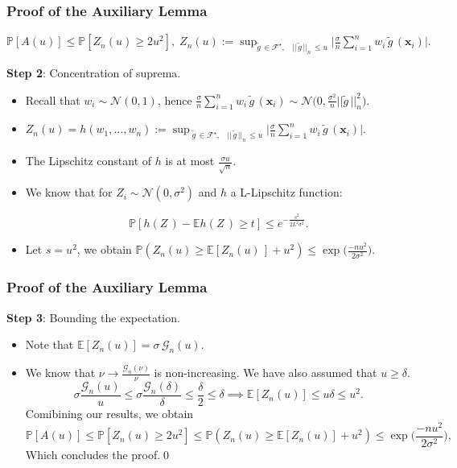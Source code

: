 \documentclass[11pt]{beamer}
\newcommand{\Prob}{\mathbb{P}}
\newcommand{\E}{\mathbb{E}}
\newcommand{\bx}{\mathbf{x}}
\newcommand{\cF}{\mathcal{F}}
\newcommand{\cG}{\mathcal{G}}
\begin{document}
	\begin{frame}
		\frametitle{Proof of the Auxiliary Lemma}
		\begin{small}
			$\Prob[A(u)] \leq \Prob[Z_n(u)\geq 2u^2], \; Z_n(u) := \sup_{\widetilde{g}\,\in \cF^\star, \;\;\; ||\,\widetilde{g}\,||_n\, \leq u}\bigg|\frac{\sigma}{n}\sum_{i = 1}^{n}w_i\,\widetilde{g}\,(\bx_i)\bigg|.$
		\end{small}
		
		\textbf{Step 2}: Concentration of suprema.
		\begin{itemize}			

			\item Recall that $w_i \sim \mathcal{N}(0, 1)$, hence
			$\frac{\sigma}{n}\sum_{i = 1}^{n}w_i \,\widetilde{g}\,(\bx_i) \sim \mathcal{N}\Big(0, \frac{\sigma^2}{n}||\widetilde{g}\,||_n^2\Big). $
				
			\item
			$Z_n(u) = h(w_1, \dots, w_n)  := \sup_{\;\widetilde{g}\,\in \cF^\star, \;\;\; ||\,\widetilde{g}\,||_n\, \leq u}\bigg|\frac{\sigma}{n}\sum_{i = 1}^{n}w_i\,\widetilde{g}\,(\bx_i)\bigg|.$
			
			\item
			The Lipschitz constant of $h$ is at most $\frac{\sigma u}{\sqrt{n}}$.
			
			\item We know that for $Z_i \sim \mathcal{N}(0, \sigma^2)$ and $h$ a L-Lipschitz function:
			\begin{small}
				\begin{equation*}
				\Prob[h(Z\,) - \E h(Z\,) \geq t]\leq e^{-\frac{s^2}{2L^2\sigma^2}}.
				\end{equation*}
			\end{small}
			\vspace{-0.5cm}
			\item Let $s = u^2$, we obtain $\Prob(Z_n(u) \geq \E[Z_n(u)\,] + u^2) \leq \exp\big(\frac{-nu^2}{2\sigma^2}\big)$.

			
		\end{itemize}		
	\end{frame}


	\begin{frame}
		\frametitle{Proof of the Auxiliary Lemma}
		\textbf{Step 3}: Bounding the expectation.
		\begin{itemize}					
		\item Note that $\E[Z_n(u)] = \sigma\, \cG_n(u)$.
		\item We know that $\nu \to \frac{\cG_n(\nu)}{\nu}$ is non-increasing. We have also assumed that $u\geq \delta$.
		\begin{equation*}
		\sigma\frac{\cG_n(u)}{u}\leq\sigma\frac{\cG_n(\delta)}{\delta} \leq \frac{\delta}{2}\leq \delta \implies \E[Z_n(u)]\leq u\delta \leq u^2.
		\end{equation*}
		Comibining our results, we obtain 
		\begin{equation*}
			\Prob[A(u)] \leq \Prob[Z_n(u) \geq 2u^2] \leq \Prob(Z_n(u) \geq \E[Z_n(u)] + u^2) \leq \exp\Big(\frac{-nu^2}{2\sigma^2}\Big),
		\end{equation*}
		Which concludes the proof.\qed
	\end{itemize}
	\end{frame}
\end{document}
